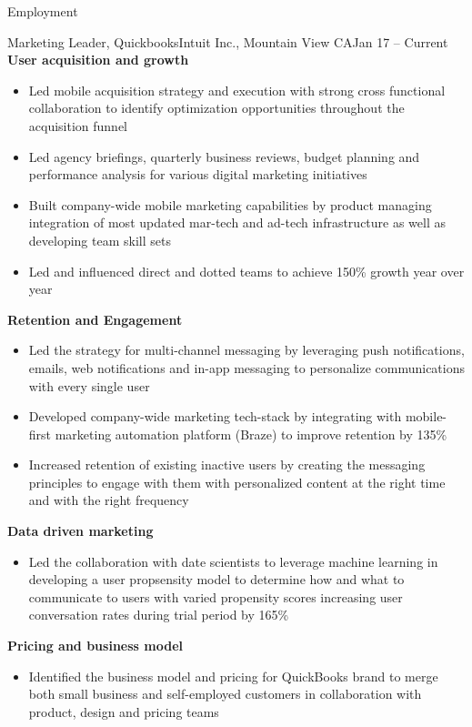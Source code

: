 \documentclass[]{mcdowellcv}
\begin{document}
	\begin{cvsection}{Employment}
		\begin{cvsubsection}{Marketing Leader, Quickbooks}{Intuit Inc., Mountain View CA}{Jan 17 -- Current}
				\textbf{User acquisition and growth}
				\begin{itemize}
				\item Led mobile acquisition strategy and execution with strong cross functional collaboration to identify optimization opportunities throughout the acquisition funnel
				\item Led agency briefings, quarterly business reviews, budget planning and performance analysis for various digital marketing initiatives
				\item Built company-wide mobile marketing capabilities by product managing integration of most updated mar-tech and ad-tech infrastructure as well as developing team skill sets
				\item Led and influenced direct and dotted teams to achieve 150\% growth year over year 
		\end{itemize}	
		\textbf{Retention and Engagement}
		\begin{itemize}
			\item Led the strategy for multi-channel messaging by leveraging push notifications, emails, web notifications and in-app messaging to personalize communications with every single user
			\item Developed company-wide marketing tech-stack by integrating with mobile-first marketing automation platform (Braze) to improve retention by 135\%
			\item Increased retention of existing inactive users by creating the messaging principles to engage with them with personalized content at the right time and with the right frequency
		\end{itemize}
		\textbf{Data driven marketing}
		\begin{itemize}
			\item Led the collaboration with date scientists to leverage machine learning in developing a user propsensity model to determine how and what to communicate to users with varied propensity scores increasing user conversation rates during trial period by 165\%
		\end{itemize}	
		\textbf{Pricing and business model}
		\begin{itemize}
			\item Identified the business model and pricing for QuickBooks brand to merge both small business and self-employed customers in collaboration with product, design and pricing teams
		\end{itemize}


\end{cvsubsection}
\end{cvsection}
\end{document}
